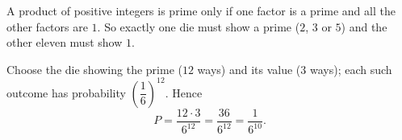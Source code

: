 A product of positive integers is prime only if one factor is a prime and all the other factors are $1$. So exactly one die must show a prime ($2$, $3$ or $5$) and the other eleven must show $1$.

Choose the die showing the prime ($12$ ways) and its value ($3$ ways); each such outcome has probability $\left(\dfrac{1}{6}\right)^{12}$. Hence
\[
P=\dfrac{12\cdot3}{6^{12}}=\dfrac{36}{6^{12}}=\boxed{\dfrac{1}{6^{10}}}.
\]
